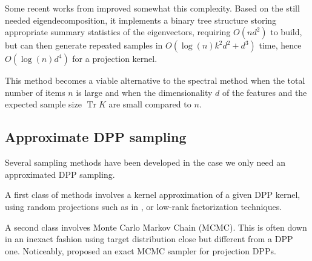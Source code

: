 Some recent works from \cite{gillenwater2019_treebased_fast_dpp_sampling} improved somewhat this complexity. Based on the still needed eigendecomposition, it implements a binary tree structure storing appropriate summary statistics of the eigenvectors, requiring $O(n d^2)$ to build, but can then generate repeated
samples in $O(\log(n)k^2d^2 + d^3)$ time, hence $O(\log(n)d^4)$ for a projection kernel.

This method becomes a viable alternative to the spectral method when the total
number of items $n$ is large and when the dimensionality $d$ of the
features and the expected sample size $\operatorname{Tr} K$ are small compared to $n$.





\subsection{Approximate DPP sampling}
Several sampling methods have been developed in the case we only need an approximated DPP sampling.

A first class of methods involves a kernel approximation of a given DPP kernel, using random projections such as in \cite{kulesza2012_dpp_for_ml}, or low-rank factorization techniques.

A second class involves Monte Carlo Markov Chain (MCMC). This is often down in an inexact fashion using target distribution close but different from a DPP one. Noticeably, \cite{gautier2017_zonotope_for_dpp_sampling} proposed an exact MCMC sampler for projection DPPs.

\vspace{10cm}
